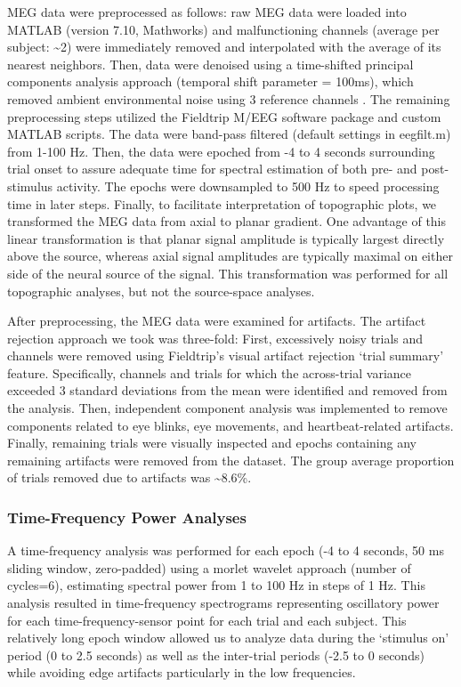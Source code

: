 MEG data were preprocessed as follows: raw MEG data were loaded into
MATLAB (version 7.10, Mathworks) and malfunctioning channels (average
per subject: \textasciitilde{}2) were immediately removed and
interpolated with the average of its nearest neighbors. Then, data were
denoised using a time-shifted principal components analysis approach
(temporal shift parameter = 100ms), which removed ambient environmental
noise using 3 reference channels \autocite{de_cheveigne_denoising_2007}.
The remaining preprocessing steps utilized the Fieldtrip M/EEG software
package \autocite{oostenveld_fieldtrip:_2010} and custom MATLAB scripts.
The data were band-pass filtered (default settings in eegfilt.m) from
1-100 Hz. Then, the data were epoched from -4 to 4 seconds surrounding
trial onset to assure adequate time for spectral estimation of both pre-
and post-stimulus activity. The epochs were downsampled to 500 Hz to
speed processing time in later steps. Finally, to facilitate
interpretation of topographic plots, we transformed the MEG data from
axial to planar gradient. One advantage of this linear transformation is
that planar signal amplitude is typically largest directly above the
source, whereas axial signal amplitudes are typically maximal on either
side of the neural source of the signal. This transformation was
performed for all topographic analyses, but not the source-space
analyses.

After preprocessing, the MEG data were examined for artifacts. The
artifact rejection approach we took was three-fold: First, excessively
noisy trials and channels were removed using Fieldtrip's visual artifact
rejection `trial summary' feature. Specifically, channels and trials for
which the across-trial variance exceeded 3 standard deviations from the
mean were identified and removed from the analysis. Then, independent
component analysis was implemented to remove components related to eye
blinks, eye movements, and heartbeat-related artifacts. Finally,
remaining trials were visually inspected and epochs containing any
remaining artifacts were removed from the dataset. The group average
proportion of trials removed due to artifacts was
\textasciitilde{}8.6\%.

\subsubsection{Time-Frequency Power
Analyses}\label{time-frequency-power-analyses}

A time-frequency analysis was performed for each epoch (-4 to 4 seconds,
50 ms sliding window, zero-padded) using a morlet wavelet approach
(number of cycles=6), estimating spectral power from 1 to 100 Hz in
steps of 1 Hz. This analysis resulted in time-frequency spectrograms
representing oscillatory power for each time-frequency-sensor point for
each trial and each subject. This relatively long epoch window allowed
us to analyze data during the `stimulus on' period (0 to 2.5 seconds) as
well as the inter-trial periods (-2.5 to 0 seconds) while avoiding edge
artifacts particularly in the low frequencies.

